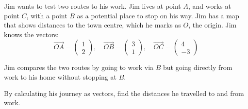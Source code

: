 \begin{example}
    Jim wants to test two routes to his work. Jim lives at point $A$, and works at point $C$, with a point $B$ as a potential place to stop on his way. Jim has a map that shows 
    distances to the town centre, which he marks as $O$, the origin. 
    Jim knows the vectors:
    \[
    \vec{OA}=\begin{pmatrix}1\\2\end{pmatrix},\quad
    \vec{OB}=\begin{pmatrix}3\\1\end{pmatrix},\quad
    \vec{OC}=\begin{pmatrix}4\\-3\end{pmatrix}
    \]

    Jim compares the two routes by going to work via $B$ but going directly from work to his home without stopping at $B$.

    By calculating his journey as vectors, find the distances he travelled to and from work.
\end{example}
